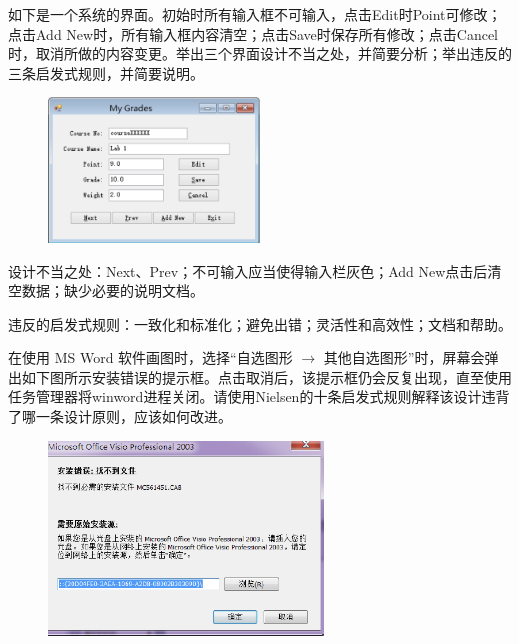 \begin{problem}[2015]
如下是一个系统的界面。初始时所有输入框不可输入，点击Edit时Point可修改；点击Add New时，所有输入框内容清空；点击Save时保存所有修改；点击Cancel时，取消所做的内容变更。举出三个界面设计不当之处，并简要分析；举出违反的三条启发式规则，并简要说明。

\begin{figure}[H]
    \vspace{-0.5em}
    \centering
    \includegraphics[width=0.5\textwidth]{2015JavaSwing.png}
    \vspace{-1em}
\end{figure}
\end{problem}

\begin{solution}
设计不当之处：Next、Prev；不可输入应当使得输入栏灰色；Add New点击后清空数据；缺少必要的说明文档。

违反的启发式规则：一致化和标准化；避免出错；灵活性和高效性；文档和帮助。
\end{solution}



\begin{problem}[2012]
在使用 MS Word 软件画图时，选择“自选图形 $\rightarrow$ 其他自选图形”时，屏幕会弹出如下图所示安装错误的提示框。点击取消后，该提示框仍会反复出现，直至使用任务管理器将winword进程关闭。请使用Nielsen的十条启发式规则解释该设计违背了哪一条设计原则，应该如何改进。

\begin{figure}[H]
    \vspace{-0.5em}
    \centering
    \includegraphics[width=0.65\textwidth]{2012word.png}
    \vspace{-1em}
\end{figure}
\end{problem}

